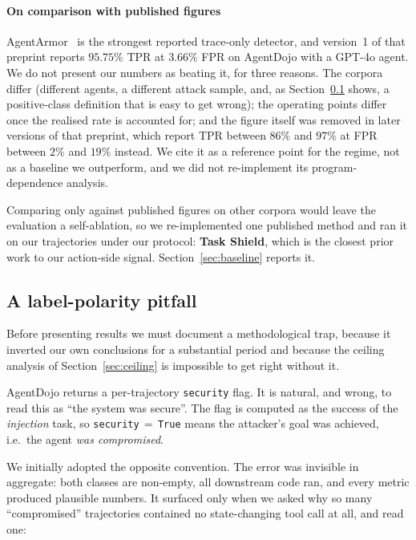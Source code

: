 \documentclass[pdflatex,sn-basic]{sn-jnl}%
\theoremstyle{thmstyleone}
\theoremstyle{thmstyletwo}
\theoremstyle{thmstylethree}
\begin{document}
\paragraph{On comparison with published figures}
AgentArmor~\citep{wang2025agentarmor} is the strongest reported trace-only
detector, and version~1 of that preprint reports $95.75\%$ TPR at $3.66\%$ FPR on
AgentDojo with a GPT-4o agent. We do not present our numbers as beating it,
for three reasons. The corpora differ (different agents, a different attack
sample, and, as Section~\ref{sec:polarity} shows, a positive-class definition
that is easy to get wrong); the operating points differ once the realised rate is
accounted for; and the figure itself was removed in later versions of that
preprint, which report TPR between $86\%$ and $97\%$ at FPR between $2\%$ and
$19\%$ instead. We cite it as a reference point for the regime, not as a baseline
we outperform, and we did not re-implement its program-dependence analysis.

Comparing only against published figures on other corpora would leave the
evaluation a self-ablation, so we re-implemented one published method and ran it
on our trajectories under our protocol: \textbf{Task Shield}, which is the closest
prior work to our action-side signal. Section~\ref{sec:baseline} reports it.

\subsection{A label-polarity pitfall}\label{sec:polarity}

Before presenting results we must document a methodological trap, because it
inverted our own conclusions for a substantial period and because the ceiling
analysis of Section~\ref{sec:ceiling} is impossible to get right without it.

AgentDojo returns a per-trajectory \texttt{security} flag. It is natural, and
wrong, to read this as ``the system was secure''. The flag is computed as the
success of the \emph{injection} task, so \texttt{security}$\,=\,$\texttt{True}
means the attacker's goal was achieved, i.e.\ the agent \emph{was compromised}.

We initially adopted the opposite convention. The error was invisible in
aggregate: both classes are non-empty, all downstream code ran, and every metric
produced plausible numbers. It surfaced only when we asked why so many
``compromised'' trajectories contained no state-changing tool call at all, and read
one:
\end{document}
